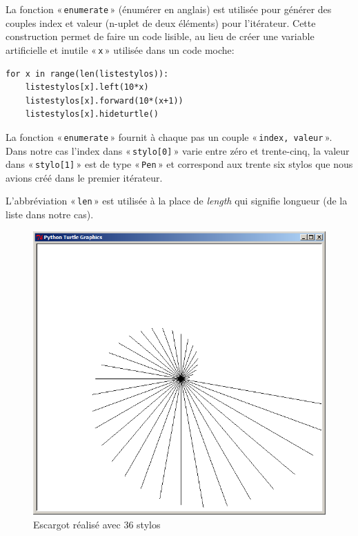 La fonction « \texttt{enumerate} »  (énumérer en anglais) est utilisée pour générer des couples index et valeur (n-uplet de deux éléments) pour l'itérateur. Cette construction permet de faire un code lisible, au lieu de créer une variable artificielle et inutile « \texttt{x} »  utilisée dans un code moche:

\begin{Verbatim}[frame=single,rulecolor=\color{gray}, label=moche]
for x in range(len(listestylos)): 
    listestylos[x].left(10*x)
    listestylos[x].forward(10*(x+1))
    listestylos[x].hideturtle()
\end{Verbatim}

La fonction « \texttt{enumerate} » fournit à chaque pas un couple « \texttt{index, valeur} ». Dans notre cas l'index dans « \texttt{stylo[0]} » varie entre zéro et trente-cinq, la valeur dans « \texttt{stylo[1]} » est de type « \texttt{Pen} » et correspond aux trente six stylos que nous avions créé dans le premier itérateur.

L'abbréviation « \texttt{len} » est utilisée à la place de \emph{length} qui signifie longueur (de la liste dans notre cas).

\begin{figure}[h!]
\centering
\includegraphics[scale=0.4]{images/escargot}
\caption{Escargot réalisé avec 36 stylos}\label{fig:escargot}
\end{figure}

